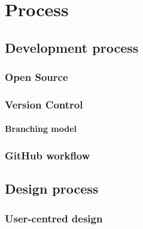\chapter{Process}\label{chap:process}


\section{Development process}


\cite{martin2003agile, highsmith2001agile}


\cite{balduino2007introduction, kroll2006agility}


\subsection{Open Source}

\cite{raymond1999cathedral, weber2004success}


\subsection{Version Control}

\cite{finley2011github}

\subsubsection{Branching model}

\cite{driessen2012successful}

\subsection{GitHub workflow}




\section{Design process}


\subsection{User-centred design}

